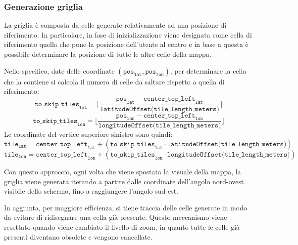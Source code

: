 \documentclass[11pt]{article}
\begin{document}
\subsubsection{Generazione griglia}
La griglia è composta da celle generate relativamente ad una posizione di riferimento. In particolare, in fase di inizializzazione viene designata come cella di riferimento quella che pone la posizione dell'utente al centro e in base a questa è possibile determinare la posizione di tutte le altre celle della mappa. 

Nello specifico, date delle coordinate $(\texttt{pos}_{\texttt{lat}}, \texttt{pos}_{\texttt{lon}})$, per determinare la cella che la contiene si calcola il numero di celle da saltare rispetto a quella di riferimento: 
\begin{equation*}
    \texttt{to\_skip\_tiles}_\texttt{lat} =
        \lceil \frac{\texttt{pos}_{\texttt{lat}} - \texttt{center\_top\_left}_{\texttt{lat}}}{\texttt{latitudeOffset(tile\_length\_meters)}} \rceil
\end{equation*}
\begin{equation*}
    \texttt{to\_skip\_tiles}_\texttt{lon} =
        \lfloor \frac{\texttt{pos}_{\texttt{lon}} - \texttt{center\_top\_left}_{\texttt{lon}}}{\texttt{longitudeOffset(tile\_length\_meters)}} \rfloor
\end{equation*}
Le coordinate del vertice superiore sinistro sono quindi:
\begin{equation*}
    \texttt{tile}_\texttt{lat} = \texttt{center\_top\_left}_{\texttt{lat}} + (\texttt{to\_skip\_tiles}_\texttt{lat} \cdot \texttt{latitudeOffset(tile\_length\_meters)})
\end{equation*}
\begin{equation*}
    \texttt{tile}_\texttt{lon} = \texttt{center\_top\_left}_{\texttt{lon}} + (\texttt{to\_skip\_tiles}_\texttt{lon} \cdot \texttt{longitudeOffset(tile\_length\_meters)})
\end{equation*}

Con questo approccio, ogni volta che viene spostata la visuale della mappa, la griglia viene generata iterando a partire dalle coordinate dell'angolo nord-ovest visibile dello schermo, fino a raggiungere l'angolo sud-est. 

In aggiunta, per maggiore efficienza, si tiene traccia delle celle generate in modo da evitare di ridisegnare una cella già presente. Questo meccanismo viene resettato quando viene cambiato il livello di zoom, in quanto tutte le celle già presenti diventano obsolete e vengono cancellate.
\end{document}
